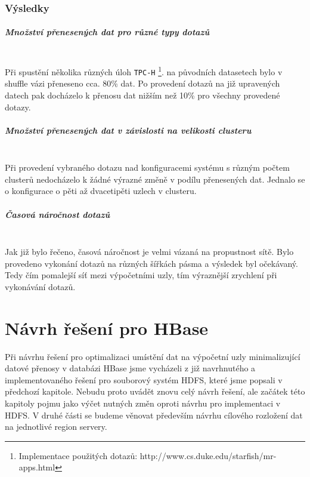 \documentclass[thesis=M,czech]{FITthesis}[2012/06/26]
\begin{document}
\subsection{Výsledky}

\paragraph{Množství přenesených dat pro různé typy dotazů} \hfill \\
Při spustění několika různých úloh \texttt{TPC-H} \footnote{Implementace použitých dotazů: http://www.cs.duke.edu/starfish/mr-apps.html}.  na původních datasetech bylo v shuffle vázi přeneseno cca. 80\% dat. Po provedení dotazů na již upravených datech pak docházelo k přenosu dat  nižším než 10\% pro všechny provedené dotazy.

\paragraph{Množství přenesených dat v závislosti na velikosti clusteru} \hfill \\
Při provedení vybraného dotazu nad konfiguracemi systému s různým počtem clusterů nedocházelo k žádné výrazné změně v podílu přenesených dat. Jednalo se o konfigurace o pěti až dvacetipěti uzlech v clusteru.

\paragraph{Časová náročnost dotazů} \hfill \\
Jak již bylo řečeno, časová náročnost je velmi vázaná na propustnost sítě. Bylo provedeno vykonání dotazů na různých šířkách pásma a výsledek byl očekávaný. Tedy čím pomalejší síť mezi výpočetními uzly, tím výraznější zrychlení při vykonávání dotazů.






\chapter{Návrh řešení pro HBase}
Při návrhu řešení pro optimalizaci umístění dat na výpočetní uzly minimalizující datové přenosy v databázi HBase jsme vycházeli z již navrhnutého a implementovaného řešení pro souborový systém HDFS, které jsme popsali v předchozí kapitole. Nebudu proto uvádět znovu celý návrh řešení, ale začátek této kapitoly pojmu jako výčet nutných změn oproti návrhu pro implementaci v HDFS. V druhé části se budeme věnovat především návrhu cílového rozložení dat na jednotlivé region servery.
\end{document}
